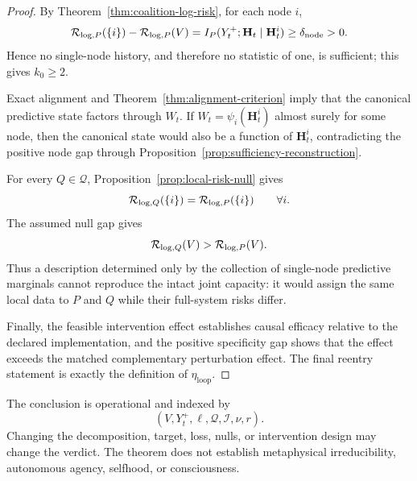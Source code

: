 \begin{proof}
By Theorem~\ref{thm:coalition-log-risk}, for each node \(i\),
\[
\mathcal R_{\log,P}(\{i\})-
\mathcal R_{\log,P}(V)
=
I_P(Y_t^+;\mathbf H_t\mid\mathbf H_t^i)
\geq
\delta_{\mathrm{node}}>0.
\]
Hence no single-node history, and therefore no statistic of one, is sufficient;
this gives \(k_0\geq2\).

Exact alignment and Theorem~\ref{thm:alignment-criterion} imply that the
canonical predictive state factors through \(W_t\). If
\(W_t=\psi_i(\mathbf H_t^i)\) almost surely for some node, then the canonical
state would also be a function of \(\mathbf H_t^i\), contradicting the positive
node gap through Proposition~\ref{prop:sufficiency-reconstruction}.

For every \(Q\in\mathcal Q\), Proposition~\ref{prop:local-risk-null} gives
\[
\mathcal R_{\log,Q}(\{i\})
=
\mathcal R_{\log,P}(\{i\})
\qquad\forall i.
\]
The assumed null gap gives
\[
\mathcal R_{\log,Q}(V)
>
\mathcal R_{\log,P}(V).
\]
Thus a description determined only by the collection of single-node predictive
marginals cannot reproduce the intact joint capacity: it would assign the same
local data to \(P\) and \(Q\) while their full-system risks differ.

Finally, the feasible intervention effect establishes causal efficacy relative
to the declared implementation, and the positive specificity gap shows that
the effect exceeds the matched complementary perturbation effect. The final
reentry statement is exactly the definition of \(\eta_{\mathrm{loop}}\).
\end{proof}

\begin{remark}
The conclusion is operational and indexed by
\[
(V,Y_t^+,\ell,\mathcal Q,\mathcal I,\nu,r).
\]
Changing the decomposition, target, loss, nulls, or intervention design may
change the verdict. The theorem does not establish metaphysical
irreducibility, autonomous agency, selfhood, or consciousness.
\end{remark}


